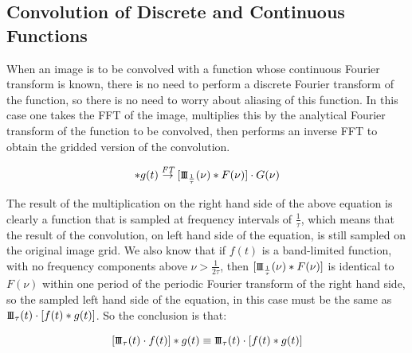 \documentclass[12pt,twoside,a4paper]{article}
\newcommand{\sha}{\mbox{\small I\!I\!I}}
\newcommand{\ftarrow}{\stackrel{\mbox{\scriptsize\it FT}}{\rightarrow}}
\begin{document}
\subsection{Convolution of Discrete and Continuous Functions}

When an image is to be convolved with a function whose continuous
Fourier transform is known, there is no need to perform a discrete
Fourier transform of the function, so there is no need to worry about
aliasing of this function. In this case one takes the FFT of the
image, multiplies this by the analytical Fourier transform of the
function to be convolved, then performs an inverse FFT to obtain the
gridded version of the convolution.

\begin{equation}
 [\sha_{\tau}(t) \cdot f(t)] \ast g(t) \ftarrow
 [\sha_{\frac{1}{\tau}}(\nu)\ast F(\nu)] \cdot G(\nu)
\end{equation}

The result of the multiplication on the right hand side of the above
equation is clearly a function that is sampled at frequency intervals
of $\frac{1}{\tau}$, which means that the result of the convolution,
on left hand side of the equation, is still sampled on the original
image grid. We also know that if $f(t)$ is a band-limited function,
with no frequency components above $\nu>\frac{1}{2\tau}$, then
$[\sha_{\frac{1}{\tau}}(\nu)\ast F(\nu)]$ is identical to $F(\nu)$
within one period of the periodic Fourier transform of the right hand
side, so the sampled left hand side of the equation, in this case must
be the same as $\sha_{\tau}(t) \cdot [f(t)\ast g(t)]$. So the
conclusion is that:

\begin{equation}
\label{discrete_cont_conv_eqn}
 [\sha_{\tau}(t) \cdot f(t)] \ast g(t) \equiv \sha_{\tau}(t) \cdot [f(t)\ast g(t)]
\end{equation}



\end{document}

